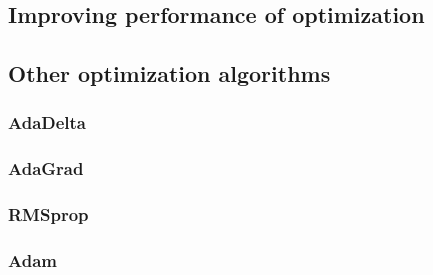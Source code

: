 \subsection{Improving performance of optimization}




\subsection{Other optimization algorithms}
\subsubsection{AdaDelta}
\subsubsection{AdaGrad}
\subsubsection{RMSprop}
\subsubsection{Adam}




